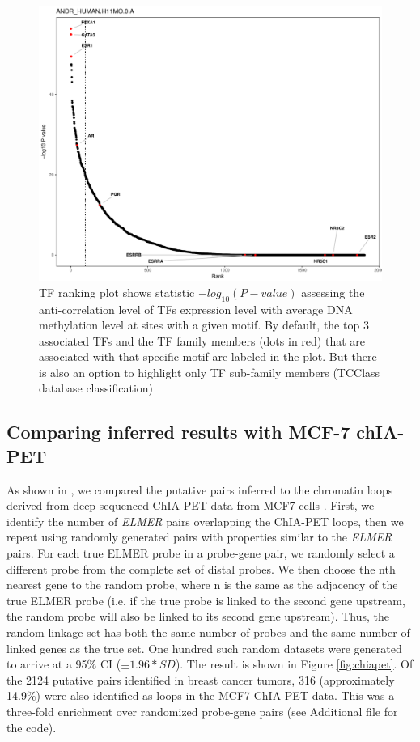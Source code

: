 \begin{figure}[ht!]
\centering
\includegraphics[width=1.0\textwidth]{images/ANDR_HUMAN_H11MO_0_A_TFrankPlot.pdf}
\caption[TF ranking plot: ANDR motif]{\label{fig:tfplot} TF ranking plot shows statistic $-log_{10}(P-value)$ assessing the anti-correlation level
of TFs expression level with average DNA methylation level at sites with a given motif. By default, the top 3 associated TFs and the TF family members (dots in red) that are associated with that specific motif  are labeled in the plot.
But there is also an option to highlight only TF sub-family members (TCClass database classification)}
\end{figure}

\newpage


\subsection*{Comparing inferred results with MCF-7 chIA-PET}

As shown in , we compared the putative pairs inferred to the chromatin loops derived from deep-sequenced ChIA-PET data from MCF7 cells \cite{li2012extensive}. First, we identify the number of \textit{ELMER} pairs overlapping the ChIA-PET loops, then we repeat using randomly generated  pairs with properties similar to the \textit{ELMER} pairs. For each true ELMER probe in a probe-gene pair, we randomly select a different probe from the complete set of distal probes. We then choose the nth nearest gene to the random probe, where n is the same as the adjacency of the true ELMER probe (i.e. if the true probe is linked to the second gene upstream, the  random probe will also be linked to its second gene upstream). Thus, the random linkage set has both the same number of probes and the same number of linked genes as the true set. One hundred such random datasets were generated to arrive at a 95\% CI ($\pm 1.96* SD$).
The result is shown in Figure \ref{fig:chiapet}. Of the 2124 putative pairs identified in breast cancer tumors, 316 (approximately 14.9\%) were also identified as loops in the MCF7 ChIA-PET data. This was a three-fold enrichment over randomized probe-gene pairs (see Additional file for the code).


